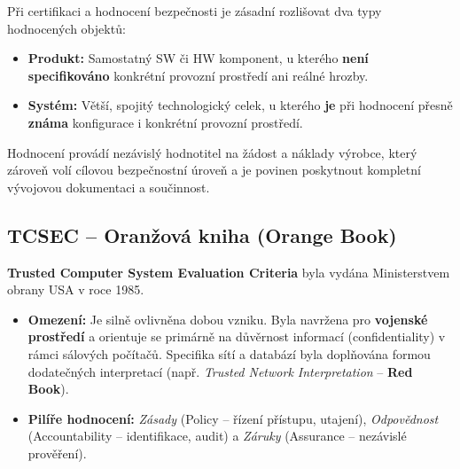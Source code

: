\documentclass[10pt,a4paper]{article}
\begin{document}
	Při certifikaci a hodnocení bezpečnosti je zásadní rozlišovat dva typy hodnocených objektů:
	\begin{itemize}
		\item \textbf{Produkt:} Samostatný SW či HW komponent, u kterého \textbf{není specifikováno} konkrétní provozní prostředí ani reálné hrozby.
		
		\item \textbf{Systém:} Větší, spojitý technologický celek, u kterého \textbf{je} při hodnocení přesně \textbf{známa} konfigurace i konkrétní provozní prostředí.
	\end{itemize}
	Hodnocení provádí nezávislý hodnotitel na žádost a náklady výrobce, který zároveň volí cílovou bezpečnostní úroveň a je povinen poskytnout kompletní vývojovou dokumentaci a součinnost.
	
	\subsection{TCSEC -- Oranžová kniha (Orange Book)}
	\textbf{Trusted Computer System Evaluation Criteria} byla vydána Ministerstvem obrany USA v roce 1985.
	
	\begin{itemize}
		\item \textbf{Omezení:} Je silně ovlivněna dobou vzniku. Byla navržena pro \textbf{vojenské prostředí} a orientuje se primárně na důvěrnost informací (confidentiality) v rámci sálových počítačů.
		Specifika sítí a databází byla doplňována formou dodatečných interpretací (např. \textit{Trusted Network Interpretation} -- \textbf{Red Book}).
		\item \textbf{Pilíře hodnocení:} 
		\textit{Zásady} (Policy -- řízení přístupu, utajení), \textit{Odpovědnost} (Accountability -- identifikace, audit) a \textit{Záruky} (Assurance -- nezávislé prověření).
	\end{itemize}
	
\end{document}
